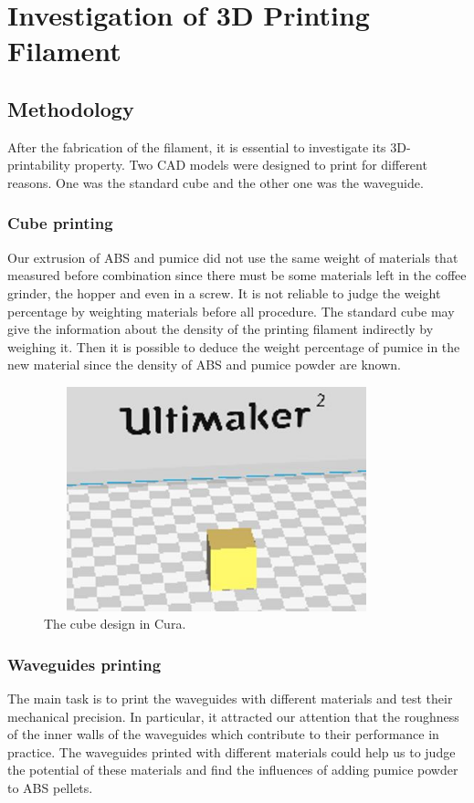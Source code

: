 \chapter{Investigation of 3D Printing Filament}
\renewcommand{\baselinestretch}{\mystretch}
\label{chap:Invest}

\section{Methodology}
After the fabrication of the filament, it is essential to investigate its 3D-printability property. Two CAD models were designed to print for different reasons. One was the standard cube and the other one was the waveguide.
\subsection{Cube printing}
Our extrusion of ABS and pumice did not use the same weight of materials that measured before combination since there must be some materials left in the coffee grinder, the hopper and even in a screw. It is not reliable to judge the weight percentage by weighting materials before all procedure. The standard cube may give the information about the density of the printing filament indirectly by weighing it. Then it is possible to deduce the weight percentage of pumice in the new material since the density of ABS and pumice powder are known.\\ 
\begin{figure}[htbp]
  \centering
  \includegraphics[height=6.5cm,width=10cm]{Figs5//cube_design.JPG}
  \caption[The cube design in Cura]{\footnotesize The cube design in Cura.}
  \label{Fig:cube}
\end{figure}
\subsection{Waveguides printing}
The main task is to print the waveguides with different materials and test their mechanical precision. In particular, it attracted our attention that the roughness of the inner walls of the waveguides which contribute to their performance in practice\cite{d20153}. The waveguides printed with different materials could help us to judge the potential of these materials and find the influences of adding pumice powder to ABS pellets.

